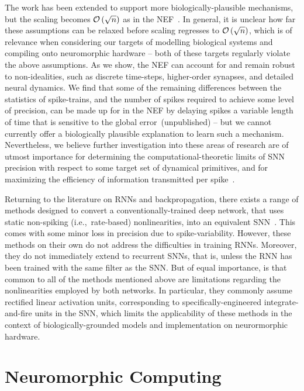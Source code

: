 The work has been extended to support more biologically-plausible mechanisms, but the scaling becomes $\mathcal{O}\left({\sqrt{n}}\right)$ as in the NEF~\citep[][Figure~12d]{schwemmer2015constructing}.
In general, it is unclear how far these assumptions can be relaxed before scaling regresses to $\mathcal{O}\left({\sqrt{n}}\right)$, which is of relevance when considering our targets of modelling biological systems and compiling onto neuromorphic hardware -- both of these targets regularly violate the above assumptions.
As we show, the NEF can account for and remain robust to non-idealities, such as discrete time-steps, higher-order synapses, and detailed neural dynamics.
We find that some of the remaining differences between the statistics of spike-trains, and the number of spikes required to achieve some level of precision, can be made up for in the NEF by delaying spikes a variable length of time that is sensitive to the global error~(unpublished) -- but we cannot currently offer a biologically plausible explanation to learn such a mechanism.
Nevertheless, we believe further investigation into these areas of research are of utmost importance for determining the computational-theoretic limits of SNN precision with respect to some target set of dynamical primitives, and for maximizing the efficiency of information transmitted per spike~\citep[][pp.~92--127]{eliasmith2003a}.

Returning to the literature on RNNs and backpropagation, there exists a range of methods designed to convert a conventionally-trained deep network, that uses static non-spiking (i.e.,~rate-based) nonlinearities, into an equivalent SNN~\citep[][and various methods mentioned in section~\ref{sec:bptt}]{cao2015spiking, rueckauer2017conversion, yousefzadehconversion2019}.
This comes with some minor loss in precision due to spike-variability.
However, these methods on their own do not address the difficulties in training RNNs.
Moreover, they do not immediately extend to recurrent SNNs, that is, unless the RNN has been trained with the same filter as the SNN.
But of equal importance, is that common to all of the methods mentioned above are limitations regarding the nonlinearities employed by both networks.
In particular, they commonly assume rectified linear activation units, corresponding to specifically-engineered integrate-and-fire units in the SNN, which limits the applicability of these methods in the context of biologically-grounded models and implementation on neurormorphic hardware.

\section{Neuromorphic Computing}
\label{sec:neuromorphic}

